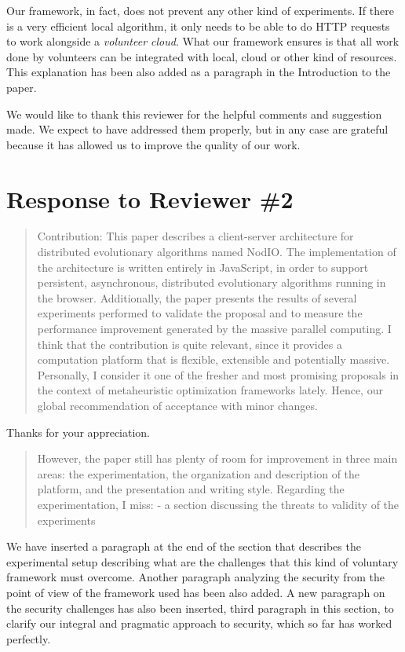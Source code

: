\documentclass[preprint]{elsarticle}
\begin{document}
Our framework, in fact, does not prevent any other kind of
experiments. If there is a very efficient local algorithm, it only
needs to be able to do HTTP requests to work alongside a {\em
  volunteer cloud}. What our framework ensures is that all work done
by volunteers can be integrated with local, cloud or other kind of
resources. This explanation has been also added as a paragraph in the
Introduction to the paper.

We would like to thank this reviewer for the helpful comments and
suggestion made. We expect to have addressed them properly, but in any
case are grateful because it has allowed us to improve the quality of
our work. 

\section{Response to Reviewer \#2}

\begin{quote}
Contribution:
This paper describes a client-server architecture for distributed evolutionary algorithms named NodIO.
The implementation of the architecture is written entirely in JavaScript, in order to support persistent,
asynchronous, distributed evolutionary algorithms running in the browser.
Additionally, the paper presents the results of several experiments performed to validate the proposal and
to measure the performance improvement generated by the massive parallel computing.
I think that the contribution is quite relevant, since it provides a computation platform that is flexible,
extensible and potentially massive. Personally, I consider it one of the fresher and most promising
proposals in the context of metaheuristic optimization frameworks lately. Hence, our global
recommendation of acceptance with minor changes.
\end{quote}

Thanks for your appreciation.

\begin{quote}
However, the paper still has plenty of room for improvement in three main areas: the experimentation, the
organization and description of the platform, and the presentation and writing style.
Regarding the experimentation, I miss:
-  a section discussing the threats to validity of the experiments

\end{quote}

We have inserted a paragraph at the end of the section that describes
the experimental setup describing what are the challenges that this
kind of voluntary framework must overcome. Another paragraph analyzing
the security from the point of view of the framework used has been
also added. A new paragraph on the security challenges has also been
inserted, third paragraph in this section, to clarify our integral and
pragmatic approach to security, which so far has worked perfectly. 
\end{document}
